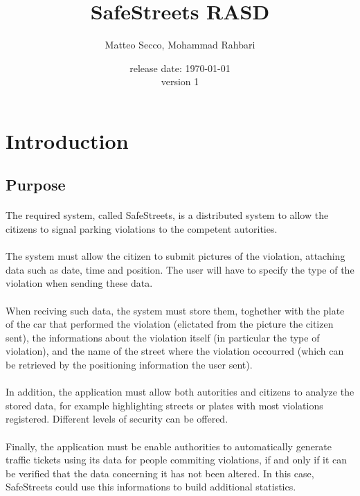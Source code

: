 \documentclass{article}
\title{SafeStreets RASD}
\date{release date: \today\\version 1}
\author{Matteo Secco, Mohammad Rahbari}
\begin{document}
\maketitle
\newpage
\tableofcontents
\pagebreak
{}


\section{Introduction}

	\subsection{Purpose}
	
		\paragraph{}The required system, called SafeStreets, is a distributed system to allow the citizens to signal parking violations to the competent autorities.
		\paragraph{}The system must allow the citizen to submit pictures of the violation, attaching data such as date, time and position. The user will have to specify the type of the violation when sending these data. 
		\paragraph{}When reciving such data, the system must store them, toghether with the plate of the car that performed the violation (elictated from the picture the citizen sent), the informations about the violation itself (in particular the type of violation), and the name of the street where the violation occourred (which can be retrieved by the positioning information the user sent).
		\paragraph{}In addition, the application must allow both autorities and citizens to analyze the stored data, for example highlighting streets or plates with most violations registered. Different levels of security can be offered.
		\paragraph{}Finally, the application must be enable authorities to automatically generate traffic tickets using its data for people commiting violations, if and only if it can be verified that the data concerning it has not been altered. In this case, SafeStreets could use this informations to build additional statistics.
\end{document}
